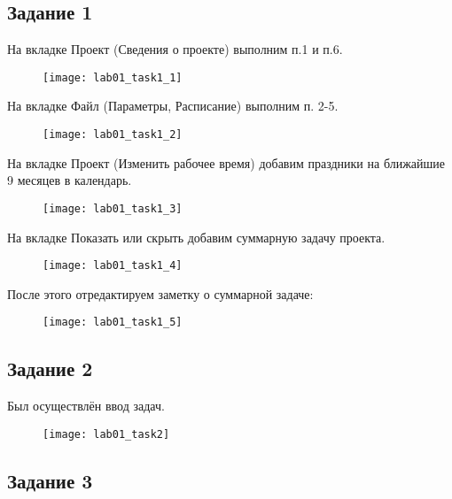 \subsection*{Задание 1}

На вкладке Проект (Сведения о проекте) выполним п.1 и п.6.

\begin{figure}[h!]
	\texttt{[image: lab01\_task1\_1]}
\end{figure}

\clearpage

На вкладке Файл (Параметры, Расписание) выполним п. 2-5.

\begin{figure}[h!]
	\texttt{[image: lab01\_task1\_2]}
\end{figure}

На вкладке Проект (Изменить рабочее время) добавим праздники на ближайшие 9 месяцев в календарь.

\begin{figure}[h!]
	\texttt{[image: lab01\_task1\_3]}
\end{figure}

\clearpage

На вкладке Показать или скрыть добавим суммарную задачу проекта.

\begin{figure}[h!]
	\texttt{[image: lab01\_task1\_4]}
\end{figure}

После этого отредактируем заметку о суммарной задаче:

\begin{figure}[h!]
	\texttt{[image: lab01\_task1\_5]}
\end{figure}

\subsection*{Задание 2}

Был осуществлён ввод задач.

\begin{figure}[h!]
	\texttt{[image: lab01\_task2]}
\end{figure}
\clearpage

\subsection*{Задание 3}

